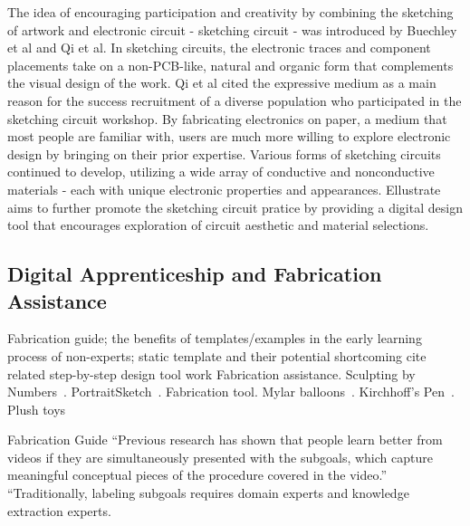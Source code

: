 \documentclass{sigchi}
\begin{document}
The idea of encouraging participation and creativity by combining the sketching of artwork and electronic circuit - sketching circuit - was introduced by Buechley et al and Qi et al. In sketching circuits, the electronic traces and component placements take on a non-PCB-like, natural and organic form that complements the visual design of the work. Qi et al cited the expressive medium as a main reason for the success recruitment of a diverse population who participated in the sketching circuit workshop. By fabricating electronics on paper, a medium that most people are familiar with, users are much more willing to explore electronic design by bringing on their prior expertise. Various forms of sketching circuits continued to develop, utilizing a wide array of conductive and nonconductive materials - each with unique electronic properties and appearances. Ellustrate aims to further promote the sketching circuit pratice by providing a digital design tool that encourages exploration of circuit aesthetic and material selections.

\subsection{Digital Apprenticeship and Fabrication Assistance}
Fabrication guide; the benefits of templates/examples in the early learning process of non-experts; 
static template and their potential shortcoming 
cite related step-by-step design tool work 
Fabrication assistance. Sculpting by Numbers~\cite{rivers_sculpting_2012}. PortraitSketch~\cite{xie_portraitsketch:_2014}.
Fabrication tool. Mylar balloons~\cite{furuta_film_2010}. Kirchhoff's Pen~\cite{de_silva_kirchhoffs_2007}. Plush toys~\cite{igarashi_designing_2009} 

Fabrication Guide 
“Previous research has shown that people learn better from videos if they are simultaneously presented with the subgoals, which capture meaningful conceptual pieces of the procedure covered in the video.” 
“Traditionally, labeling subgoals requires domain experts and knowledge extraction experts.


\end{document}
